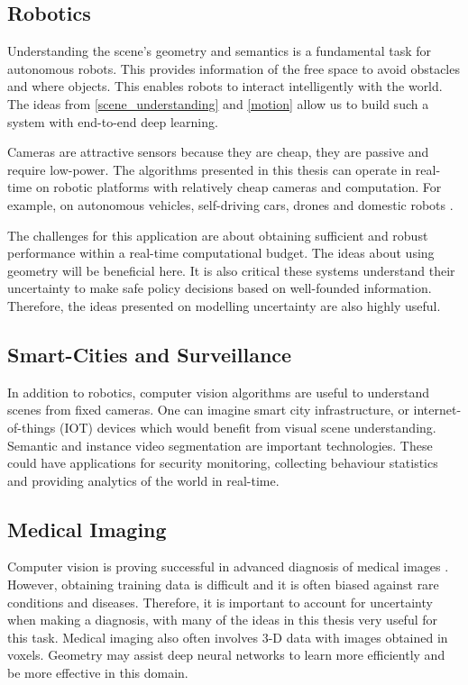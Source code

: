 \subsection{Robotics}
Understanding the scene’s geometry and semantics is a fundamental task for autonomous robots. This provides information of the free space to avoid obstacles and where objects. This enables robots to interact intelligently with the world. The ideas from \cref{scene_understanding} and \cref{motion} allow us to build such a system with end-to-end deep learning.

Cameras are attractive sensors because they are cheap, they are passive and require low-power. The algorithms presented in this thesis can operate in real-time on robotic platforms with relatively cheap cameras and computation. For example, on autonomous vehicles, self-driving cars, drones and domestic robots \citep{kendall2014board,mcallister2017av_bdl}.

The challenges for this application are about obtaining sufficient and robust performance within a real-time computational budget. The ideas about using geometry will be beneficial here. It is also critical these systems understand their uncertainty to make safe policy decisions based on well-founded information. Therefore, the ideas presented on modelling uncertainty are also highly useful.

\subsection{Smart-Cities and Surveillance}
In addition to robotics, computer vision algorithms are useful to understand scenes from fixed cameras. One can imagine smart city infrastructure, or internet-of-things (IOT) devices which would benefit from visual scene understanding. Semantic and instance video segmentation are important technologies. These could have applications for security monitoring, collecting behaviour statistics and providing analytics of the world in real-time.

\subsection{Medical Imaging}
Computer vision is proving successful in advanced diagnosis of medical images \citep{ronneberger2015u}. However, obtaining training data is difficult and it is often biased against rare conditions and diseases. Therefore, it is important to account for uncertainty when making a diagnosis, with many of the ideas in this thesis very useful for this task. Medical imaging also often involves 3-D data with images obtained in voxels. Geometry may assist deep neural networks to learn more efficiently and be more effective in this domain.

